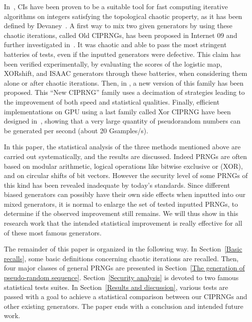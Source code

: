 \documentclass[10pt, conference, compsocconf]{IEEEtran}
\begin{document}
In~\cite{Guyeux10}, CIs have been proven to be a suitable tool for fast computing iterative algorithms on integers satisfying the topological chaotic property, as it has been defined by Devaney~\cite{Dev89}.
A first way to mix two given generators by using these chaotic iterations, called Old CIPRNGs, has been proposed in Internet 09 \cite{bgw09:ip} and further investigated in~\cite{bgw10:ip,guyeux09,guyeuxTaiwan10}. It was chaotic and able to pass the most stringent batteries of tests, even if the inputted generators were defective.
 This claim has been verified experimentally, by evaluating the scores of the logistic map, XORshift, and ISAAC generators through these batteries, when considering them alone or after chaotic iterations.
Then, in \cite{wbg10:ip}, a new version of this family has been proposed.
This ``New CIPRNG'' family uses a decimation of strategies leading to the improvement of both speed and statistical qualities. Finally, efficient implementations on  GPU using a last family called Xor CIPRNG have been designed in~\cite{arxivRCCGPCH}, showing that a very large quantity of pseudorandom numbers can be generated per second (about 20 Gsamples/s).


In this paper, the statistical analysis of the three methods mentioned above are carried out systematically, and the results are discussed.
Indeed PRNGs are often based on modular arithmetic, logical operations like bitwise exclusive or (XOR), and on circular shifts of
bit vectors.
However the security level of some PRNGs of this kind has been revealed inadequate by today's standards.
Since different biased generators can possibly have their own side effects when inputted into our mixed generators, it is normal to enlarge the set of tested inputted PRNGs, to determine if the observed improvement still remains.
We will thus show in this research work that the intended statistical improvement is really effective for all of these most famous generators.

The remainder of this paper is organized in the following way. In Section~\ref{Basic recalls}, some basic definitions concerning chaotic iterations are recalled. Then, four major classes of general PRNGs are presented in Section~\ref{The generation of pseudo-random sequence}. Section~\ref{Security analysis} is devoted to two famous statistical tests suites. In Section~\ref{Results and discussion}, various tests are passed with a goal to achieve a statistical comparison between our CIPRNGs and other existing generators. The paper ends with a conclusion and intended future work.
\end{document}
